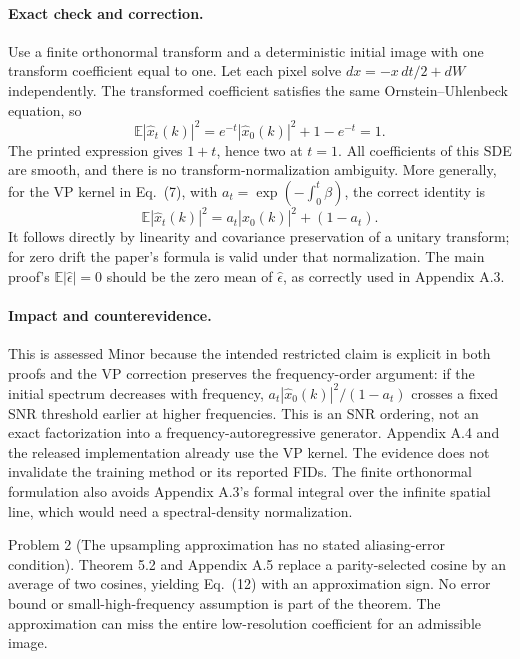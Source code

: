 \documentclass[10pt]{article}
\begin{document}
\paragraph*{Exact check and correction.}\mbox{}\par
Use a finite orthonormal transform and a deterministic initial image with one transform coefficient equal to one. Let each pixel solve \(dx=-x\,dt/2+dW\) independently. The transformed coefficient satisfies the same Ornstein–Uhlenbeck equation, so \[\mathbb E|\widehat x_t(k)|^2=e^{-t}|\widehat x_0(k)|^2+1-e^{-t}=1.\] The printed expression gives \(1+t\), hence two at \(t=1\). All coefficients of this SDE are smooth, and there is no transform-normalization ambiguity. More generally, for the VP kernel in Eq. (7), with \(a_t=\exp(-\int_0^t\beta)\), the correct identity is \[\mathbb E|\widehat x_t(k)|^2=a_t|\widehat x_0(k)|^2+(1-a_t).\] It follows directly by linearity and covariance preservation of a unitary transform; for zero drift the paper’s formula is valid under that normalization. The main proof’s \(\mathbb E|\widehat\epsilon|=0\) should be the zero mean of \(\widehat\epsilon\), as correctly used in Appendix A.3.\par
\paragraph*{Impact and counterevidence.}\mbox{}\par
This is assessed Minor because the intended restricted claim is explicit in both proofs and the VP correction preserves the frequency-order argument: if the initial spectrum decreases with frequency, \(a_t|\widehat x_0(k)|^2/(1-a_t)\) crosses a fixed SNR threshold earlier at higher frequencies. This is an SNR ordering, not an exact factorization into a frequency-autoregressive generator. Appendix A.4 and the released implementation already use the VP kernel. The evidence does not invalidate the training method or its reported FIDs. The finite orthonormal formulation also avoids Appendix A.3’s formal integral over the infinite spatial line, which would need a spectral-density normalization.\par
Problem 2 (The upsampling approximation has no stated aliasing-error condition).  Theorem 5.2 and Appendix A.5 replace a parity-selected cosine by an average of two cosines, yielding Eq. (12) with an approximation sign. No error bound or small-high-frequency assumption is part of the theorem. The approximation can miss the entire low-resolution coefficient for an admissible image.\par
\end{document}

